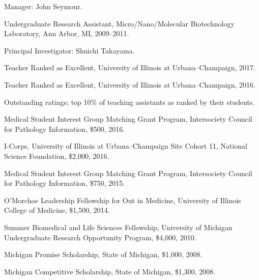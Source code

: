 \documentclass[11pt,article,oneside]{memoir}
\begin{document}
\ind \hspace{0.35in} \footnotesize Manager: John Seymour.\normalsize\vspace{0.05in}

\ind Undergraduate Research Assistant, Micro/Nano/Molecular Biotechnology Laboratory, Ann Arbor, MI, 2009--2011.

\ind \hspace{0.35in} \footnotesize Principal Investigator: Shuichi Takayama.\normalsize\vspace{0.05in}
 
\bigskip
 

\ind Teacher Ranked as Excellent, University of Illinois at Urbana--Champaign, 2017.

\ind Teacher Ranked as Excellent, University of Illinois at Urbana--Champaign, 2016.

\ind \hspace{0.35in} \footnotesize Outstanding ratings; top 10\% of teaching assistants as ranked by their students. \normalsize\vspace{0.05in}

\ind Medical Student Interest Group Matching Grant Program, Intersociety Council for Pathology Information, \$500, 2016.

\ind I-Corps, University of Illinois at Urbana--Champaign Site Cohort 11, National Science Foundation, \$2,000, 2016.

\ind Medical Student Interest Group Matching Grant Program, Intersociety Council for Pathology Information, \$750, 2015.

\ind O'Morchoe Leadership Fellowship for Out in Medicine, University of Illinois College of Medicine, \$1,500, 2014.

\ind Summer Biomedical and Life Sciences Fellowship, University of Michigan Undergraduate Research Opportunity Program, \$4,000, 2010.

\ind Michigan Promise Scholarship, State of Michigan, \$1,000, 2008.

\ind Michigan Competitive Scholarship, State of Michigan, \$1,300, 2008.

\bigskip\bigskip
 

\medskip\vspace{0.20em}
\end{document}
